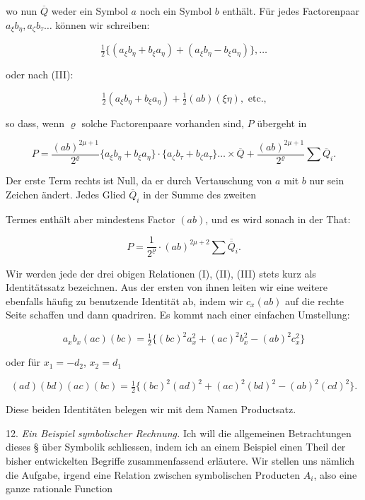 \documentclass[11pt]{article}
\providecommand{\gesperrt}[1]{\textls[130]{#1}}
\providecommand{\weberpage}[1]{}
\providecommand{\weq}[2]{\begin{equation}\tag{#1}#2\end{equation}}
\begin{document}
wo nun $\overline{Q}$ weder ein Symbol $a$ noch ein Symbol $b$ enthält.
Für jedes Factorenpaar $a_\xi b_\eta, a_\zeta b_\tau \ldots$ können wir
schreiben:

\[ \tfrac{1}{2}\{(a_\xi b_\eta + b_\xi a_\eta) + (a_\xi b_\eta - b_\xi a_\eta)\}, \ldots \]

oder nach (III):

\[ \tfrac{1}{2} (a_\xi b_\eta + b_\xi a_\eta) + \tfrac{1}{2} (ab)(\xi\eta), \text{ etc.,} \]

so dass, wenn $\varrho$ solche Factorenpaare vorhanden sind, $P$ übergeht in

\[
P = \frac{(ab)^{2\mu+1}}{2^\varrho}\{a_\xi b_\eta + b_\xi a_\eta\}\cdot
\{a_\zeta b_\tau + b_\zeta a_\tau\}\ldots \times \overline{Q}
+ \frac{(ab)^{2\mu+1}}{2^\varrho}\sum \overline{Q}_i.
\]

Der erste Term rechts ist Null, da er durch Vertauschung von $a$ mit
$b$ nur sein Zeichen ändert. Jedes Glied $\overline{Q}_i$ in der Summe des zweiten


\weberpage{14}
Termes enthält aber mindestens \gesperrt{Einen} Factor $(ab)$, und es wird
sonach in der That:

\[ P = \frac{1}{2^\varrho}\cdot (ab)^{2\mu+2}\sum \overline{\overline{Q}}_i. \]

Wir werden jede der drei obigen Relationen (I), (II), (III) stets
kurz als \glqq Identitätssatz\grqq{} bezeichnen. Aus der ersten von ihnen
leiten wir eine weitere ebenfalls häufig zu benutzende Identität ab,
indem wir $c_x (ab)$ auf die rechte Seite schaffen und dann quadriren.
Es kommt nach einer einfachen Umstellung:

\weq{IV}{a_xb_x(ac)(bc) = \tfrac{1}{2}\{(bc)^2a_x^2 + (ac)^2b_x^2 - (ab)^2c_x^2\}}

oder für $x_1 = -d_2$, $x_2 = d_1$

\weq{V}{(ad)(bd)(ac)(bc) = \tfrac{1}{2}\{(bc)^2(ad)^2 + (ac)^2(bd)^2 - (ab)^2(cd)^2\}.}

Diese beiden Identitäten belegen wir mit dem Namen \glqq Productsatz\grqq{}.

12. \textit{Ein Beispiel symbolischer Rechnung.} Ich will die allgemeinen
Betrachtungen dieses § über Symbolik schliessen, indem ich an einem
Beispiel einen Theil der bisher entwickelten Begriffe zusammenfassend
erläutere. Wir stellen uns nämlich die Aufgabe, irgend eine Relation
zwischen symbolischen Producten $A_i$, also eine ganze rationale Function
\end{document}
